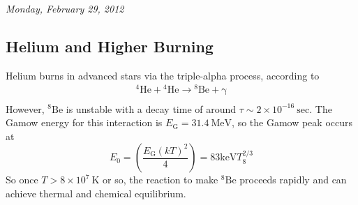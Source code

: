 \documentclass[10pt]{article}
\numberwithin{equation}{section}
\newcommand{\n}{\noindent}
\begin{document}
    \n \textit{Monday, February 29, 2012}
    \subsection{Helium and Higher Burning}
    \label{sec:helium-burning}

    Helium burns in advanced stars via the triple-alpha process,
    according to
    \begin{align}
      \label{eq:264}
      \mathrm{{}^4He+{}^4He\to{}^8Be+\gamma}\\
    \end{align}
    However, $\mathrm{{}^8Be}$ is unstable with a decay time of around
    $\tau\sim 2\times 10^{-16}\ \mathrm{sec}$.  The Gamow energy for
    this interaction is $E_{\mathrm{G}}=31.4\ \mathrm{MeV}$, so the
    Gamow peak occurs at
    \begin{equation}
      \label{eq:265}
      E_0=\left(\frac{E_{\mathrm{G}}(kT)^2}{4}\right)=83\mathrm{keV}T_8^
{2/3}
    \end{equation}
    So once $T>8\times 10^7\ \mathrm{K}$ or so, the reaction to make
    $\mathrm{{}^8Be}$ proceeds rapidly and can achieve thermal and
    chemical equilibrium.\\
\end{document}
